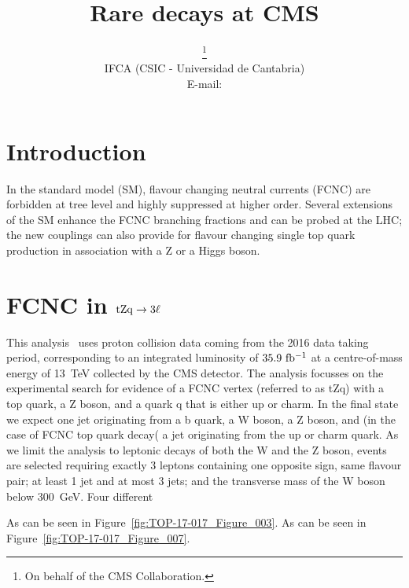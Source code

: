 \documentclass{PoS}
\title{Rare decays at CMS}
\author{\speaker{J\'onatan Piedra}\thanks{On behalf of the CMS Collaboration.}\\
        IFCA (CSIC - Universidad de Cantabria)\\
        E-mail: \email{piedra@cern.ch}}
\begin{document}
\section{Introduction}

In the standard model (SM), flavour changing neutral currents (FCNC) are forbidden
at tree level and highly suppressed at higher order. Several extensions of the SM
enhance the FCNC branching fractions and can be probed at the LHC; the new couplings
can also provide for flavour changing single top quark production in association
with a Z or a Higgs boson.


\section{FCNC in ${\rm tZq \to 3\ell}$}

This analysis~\cite{top-17-017} uses proton collision data coming from the
2016 data taking period, corresponding to an integrated luminosity of
${\rm 35.9~fb^{-1}}$ at a centre-of-mass energy of 13~TeV collected by the CMS
detector. The analysis focusses on the experimental search for evidence of a FCNC
vertex (referred to as tZq) with a top quark, a Z boson, and a quark q that is
either up or charm. In the final state we expect one jet originating from a b quark,
a W boson, a Z boson, and (in the case of FCNC top quark decay( a jet originating
from the up or charm quark. As we limit the analysis to leptonic decays of both the
W and the Z boson, events are selected requiring exactly 3 leptons containing one
opposite sign, same flavour pair; at least 1 jet and at most 3 jets; and the
transverse mass of the W boson below 300~GeV. Four different

As can be seen in Figure~\ref{fig:TOP-17-017_Figure_003}.
As can be seen in Figure~\ref{fig:TOP-17-017_Figure_007}.
\end{document}
